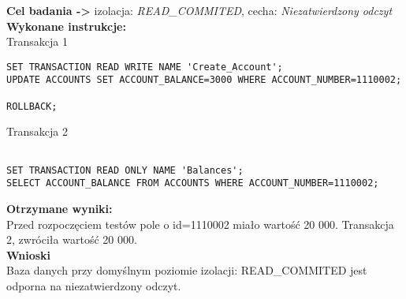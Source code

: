 \documentclass[11pt,oneside, a4paper]{article}
\title{}
\date{}
\begin{document}
\justify
\textbf{Cel badania ->} izolacja:
\textit{READ\_COMMITED}, cecha:
\textit{Niezatwierdzony odczyt} \\
\textbf{Wykonane instrukcje: } \\
Transakcja 1
\begin{lstlisting}
SET TRANSACTION READ WRITE NAME 'Create_Account';
UPDATE ACCOUNTS SET ACCOUNT_BALANCE=3000 WHERE ACCOUNT_NUMBER=1110002;

ROLLBACK;
\end{lstlisting}
Transakcja 2
\begin{lstlisting}

SET TRANSACTION READ ONLY NAME 'Balances';
SELECT ACCOUNT_BALANCE FROM ACCOUNTS WHERE ACCOUNT_NUMBER=1110002;
\end{lstlisting}
\textbf{Otrzymane wyniki:} \\
    Przed rozpoczęciem testów pole o id=1110002 miało wartość 20 000. Transakcja 2, zwróciła  wartość 20 000.\\
\textbf{Wnioski} \\
    Baza danych przy domyślnym poziomie izolacji: READ\_COMMITED jest odporna na niezatwierdzony odczyt. \\
\newpage
\end{document}
